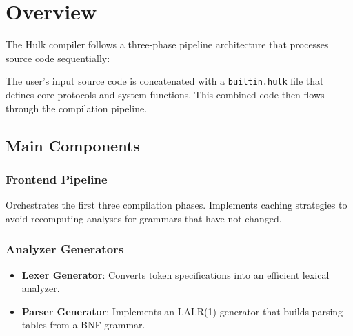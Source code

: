 \documentclass[12pt,a4paper]{report}
\begin{document}
\section{Overview}

The Hulk compiler follows a three-phase pipeline architecture that processes source code sequentially:

\begin{center}
\end{center}

The user's input source code is concatenated with a \texttt{builtin.hulk} file that defines core protocols and system functions.
This combined code then flows through the compilation pipeline.

\subsection{Main Components}

\subsubsection{Frontend Pipeline}

Orchestrates the first three compilation phases.
Implements caching strategies to avoid recomputing analyses for grammars that have not changed.

\subsubsection{Analyzer Generators}

\begin{itemize}
    \item \textbf{Lexer Generator}: Converts token specifications into an efficient lexical analyzer.
    \item \textbf{Parser Generator}: Implements an LALR(1) generator that builds parsing tables from a BNF grammar.
\end{itemize}
\end{document}
